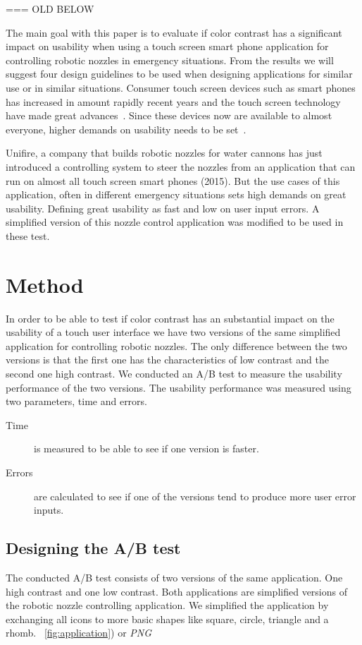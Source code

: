 \documentclass[runningheads,a4paper,oribibl]{llncs}
\begin{document}
=== OLD BELOW

The main goal with this paper is to evaluate if color contrast has a significant impact on usability when using a touch screen smart phone application for controlling robotic nozzles in emergency situations. From the results we will suggest four design guidelines to be used when designing applications for similar use or in similar situations. Consumer touch screen devices such as smart phones has increased in amount rapidly recent years and the touch screen technology have made great advances~\cite{jennings2013touch}. Since these devices now are available to almost everyone, higher demands on usability needs to be set~\cite{paredes2014sosphone}.

Unifire, a company that builds robotic nozzles for water cannons has just introduced a controlling system to steer the nozzles from an application that can run on almost all touch screen smart phones (2015). But the use cases of this application, often in different emergency situations sets high demands on great usability. Defining great usability as fast and low on user input errors. A simplified version of this nozzle control application was modified to be used in these test.

\section{Method}
In order to be able to test if color contrast has an substantial impact on the usability of a touch user interface we have two versions of the same simplified application for controlling robotic nozzles. The only difference between the two versions is that the first one has the characteristics of low contrast and the second one high contrast. We conducted an A/B test to measure the usability performance of the two versions. The usability performance was measured using two parameters, time and errors.
\begin{description}
\item[Time] is measured to be able to see if one version is faster.
\item[Errors] are calculated to see if one of the versions tend to produce more user error inputs.
\end{description}


\subsection{Designing the A/B test}
The conducted A/B test consists of two versions of the same application. One high contrast and one low contrast. Both applications are simplified versions of the robotic nozzle controlling application. We simplified the application by exchanging all icons to more basic shapes like square, circle, triangle and a rhomb. ~\ref{fig:application}) or \textit{PNG}
\end{document}
